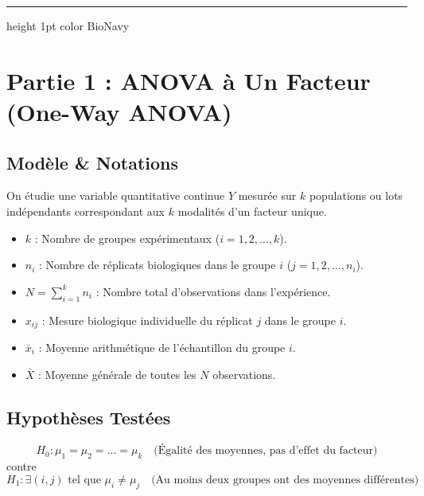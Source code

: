 \documentclass[11pt,a4paper]{article}
\begin{document}
\vspace{3mm}
\hrule height 1pt color BioNavy
\vspace{3mm}

\section{Partie 1 : ANOVA à Un Facteur (One-Way ANOVA)}

\subsection{Modèle \& Notations}
On étudie une variable quantitative continue $Y$ mesurée sur $k$ populations ou lots indépendants correspondant aux $k$ modalités d'un facteur unique.
\begin{itemize}[leftmargin=*, label=\faAngleRight]
  \item $k$ : Nombre de groupes expérimentaux ($i = 1, 2, \dots, k$).
  \item $n_i$ : Nombre de réplicats biologiques dans le groupe $i$ ($j = 1, 2, \dots, n_i$).
  \item $N = \sum_{i=1}^k n_i$ : Nombre total d'observations dans l'expérience.
  \item $x_{ij}$ : Mesure biologique individuelle du réplicat $j$ dans le groupe $i$.
  \item $\bar{x}_i$ : Moyenne arithmétique de l'échantillon du groupe $i$.
  \item $\bar{X}$ : Moyenne générale de toutes les $N$ observations.
\end{itemize}

\subsection{Hypothèses Testées}
\begin{equation*}
H_0 : \mu_1 = \mu_2 = \dots = \mu_k \quad \text{(Égalité des moyennes, pas d'effet du facteur)}
\end{equation*}
contre
\begin{equation*}
H_1 : \exists (i, j) \text{ tel que } \mu_i \neq \mu_j \quad \text{(Au moins deux groupes ont des moyennes différentes)}
\end{equation*}
\end{document}
